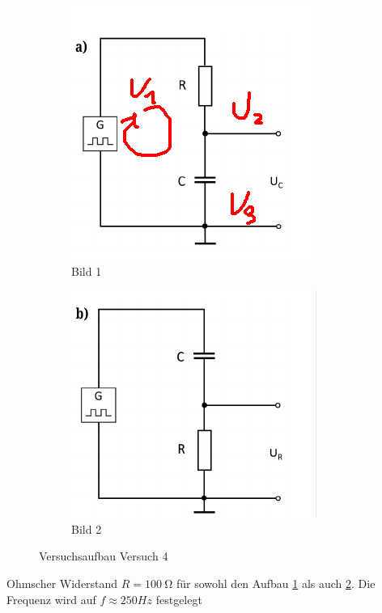         \begin{figure}[H]
        	\begin{subfigure}{0.48\linewidth}
        		\includegraphics[width=\linewidth]{bilder/versucha.png}
        		\caption{Bild 1}
        		\label{fig:bild1}
        	\end{subfigure}
        	\hfill
        	\begin{subfigure}{0.48\linewidth}
        		\includegraphics[width=\linewidth]{bilder/versuchb.png}
        		\caption{Bild 2}
        		\label{fig:bild2}
        	\end{subfigure}
        	\caption{Versuchsaufbau Versuch 4}
        	\label{fig:zwei-bilder}
        \end{figure}
        Ohmscher Widerstand $R = 100\ \mathrm{\Omega}$ für sowohl den Aufbau \ref{fig:bild1} als auch \ref{fig:bild2}. Die Frequenz wird auf $f \approx 250Hz $ festgelegt
\newpage
